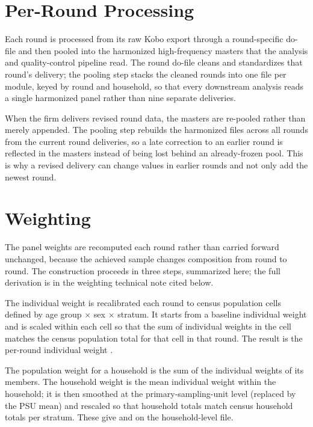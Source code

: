 
\section{Per-Round Processing}

Each round is processed from its raw Kobo export through a round-specific do-file and then
pooled into the harmonized high-frequency masters that the analysis and quality-control
pipeline read. The round do-file cleans and standardizes that round's delivery; the pooling
step stacks the cleaned rounds into one file per module, keyed by round and household, so that
every downstream analysis reads a single harmonized panel rather than nine separate deliveries.

When the firm delivers revised round data, the masters are re-pooled rather than merely
appended. The pooling step rebuilds the harmonized files across all rounds from the current
round deliveries, so a late correction to an earlier round is reflected in the masters instead
of being lost behind an already-frozen pool. This is why a revised delivery can change values
in earlier rounds and not only add the newest round.

\section{Weighting}

The panel weights are recomputed each round rather than carried forward unchanged, because the
achieved sample changes composition from round to round. The construction proceeds in three
steps, summarized here; the full derivation is in the weighting technical note cited below.

The individual weight is recalibrated each round to census population cells defined by age
group $\times$ sex $\times$ stratum. It starts from a baseline individual weight and is scaled
within each cell so that the sum of individual weights in the cell matches the census population
total for that cell in that round. The result is the per-round individual weight .

The population weight for a household is the sum of the individual weights of its members. The
household weight is the mean individual weight within the household; it is then smoothed at the
primary-sampling-unit level (replaced by the PSU mean) and rescaled so that household totals
match census household totals per stratum. These give  and  on the
household-level file.

